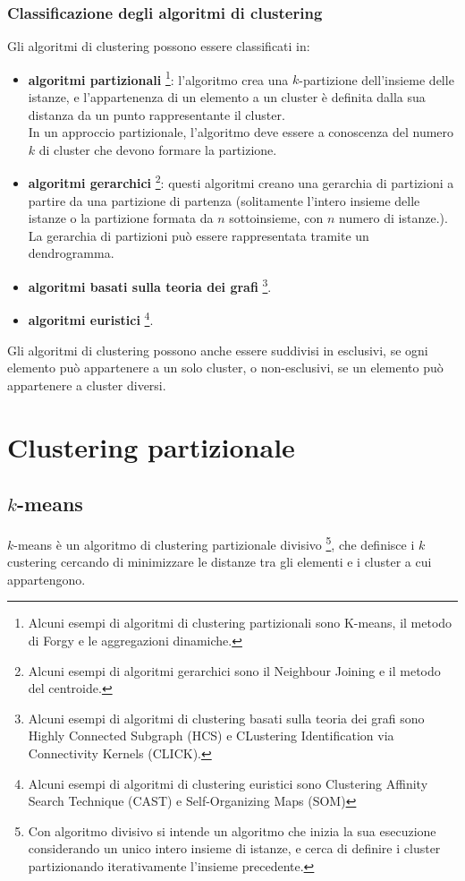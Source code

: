 \subsubsection{Classificazione degli algoritmi di clustering}
Gli algoritmi di clustering possono essere classificati in:
\begin{itemize}
    \item \textbf{algoritmi partizionali} \footnote{Alcuni esempi di algoritmi di clustering partizionali sono K-means, il metodo di Forgy e le aggregazioni dinamiche.}: l'algoritmo crea una $k$-partizione dell'insieme delle istanze, e l'appartenenza di un elemento a un cluster è definita dalla sua distanza da un punto rappresentante il cluster.\\
    In un approccio partizionale, l'algoritmo deve essere a conoscenza del numero $k$ di cluster che devono formare la partizione.\\
    \item \textbf{algoritmi gerarchici} \footnote{Alcuni esempi di algoritmi gerarchici sono il Neighbour Joining e il metodo del centroide.}: questi algoritmi creano una gerarchia di partizioni a partire da una partizione di partenza (solitamente l'intero insieme delle istanze o la partizione formata da $n$ sottoinsieme, con $n$ numero di istanze.).\\
    La gerarchia di partizioni può essere rappresentata tramite un dendrogramma.
    \item \textbf{algoritmi basati sulla teoria dei grafi} \footnote{Alcuni esempi di algoritmi di clustering basati sulla teoria dei grafi sono Highly Connected Subgraph (HCS) e CLustering Identification via Connectivity Kernels (CLICK).}.
    \item \textbf{algoritmi euristici} \footnote{Alcuni esempi di algoritmi di clustering euristici sono Clustering Affinity Search Technique (CAST) e Self-Organizing Maps (SOM)}.
\end{itemize}
Gli algoritmi di clustering possono anche essere suddivisi in esclusivi, se ogni elemento può appartenere a un solo cluster, o non-esclusivi, se un elemento può appartenere a cluster diversi.

\section{Clustering partizionale}
\subsection{$k$-means}
$k$-means è un algoritmo di clustering partizionale divisivo \footnote{Con algoritmo divisivo si intende un algoritmo che inizia la sua esecuzione considerando un unico intero insieme di istanze, e cerca di definire i cluster partizionando iterativamente l'insieme precedente.}, che definisce i $k$ custering cercando di minimizzare le distanze tra gli elementi e i cluster a cui appartengono.


